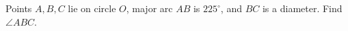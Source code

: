 Points $A,B,C$ lie on circle $O$, major arc $AB$ is $225^\circ$, and $BC$ is a diameter. Find $\angle ABC$.
